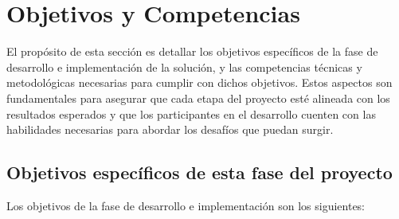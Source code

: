 \section{Objetivos y Competencias}

El propósito de esta sección es detallar los objetivos específicos de la fase de desarrollo e implementación de la solución, y las competencias técnicas y metodológicas necesarias para cumplir con dichos objetivos. 
Estos aspectos son fundamentales para asegurar que cada etapa del proyecto esté alineada con los resultados esperados y que los participantes en el desarrollo cuenten con las habilidades necesarias para abordar los desafíos que puedan surgir.


\subsection{Objetivos específicos de esta fase del proyecto}

Los objetivos de la fase de desarrollo e implementación son los siguientes:

